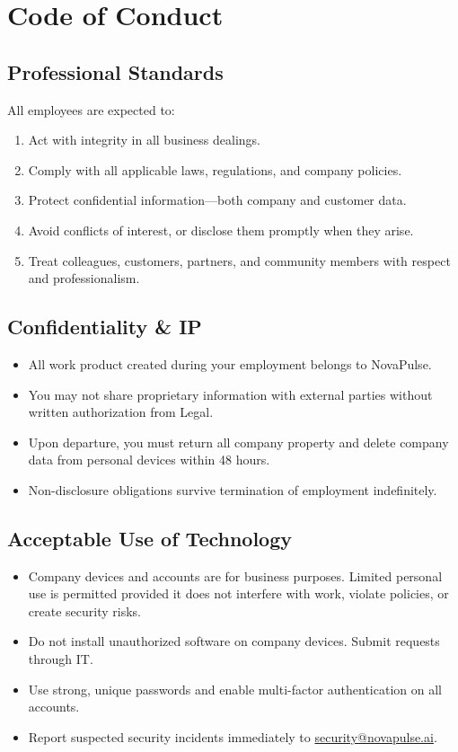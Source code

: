 \documentclass[
    language=english,
    doctype=employee-handbook,
    institution=none,
]{../../omnilatex}
\begin{document}
\section{Code of Conduct}

\subsection{Professional Standards}

All employees are expected to:

\begin{enumerate}
    \item Act with integrity in all business dealings.
    \item Comply with all applicable laws, regulations, and company policies.
    \item Protect confidential information---both company and customer data.
    \item Avoid conflicts of interest, or disclose them promptly when they
          arise.
    \item Treat colleagues, customers, partners, and community members with
          respect and professionalism.
\end{enumerate}

\subsection{Confidentiality \& IP}

\begin{itemize}
    \item All work product created during your employment belongs to NovaPulse.
    \item You may not share proprietary information with external parties
          without written authorization from Legal.
    \item Upon departure, you must return all company property and delete
          company data from personal devices within 48 hours.
    \item Non-disclosure obligations survive termination of employment
          indefinitely.
\end{itemize}

\subsection{Acceptable Use of Technology}

\begin{itemize}
    \item Company devices and accounts are for business purposes. Limited
          personal use is permitted provided it does not interfere with
          work, violate policies, or create security risks.
    \item Do not install unauthorized software on company devices. Submit
          requests through IT.
    \item Use strong, unique passwords and enable multi-factor authentication
          on all accounts.
    \item Report suspected security incidents immediately to
          \href{mailto:security@novapulse.ai}{security@novapulse.ai}.
\end{itemize}
\end{document}
